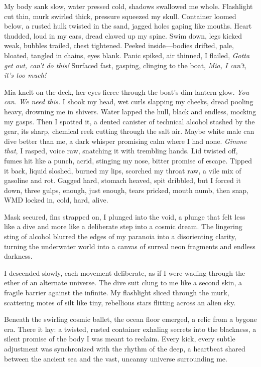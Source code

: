 \documentclass[12pt,oneside]{book}
\begin{document}
My body sank slow, water pressed cold, shadows swallowed me whole. Flashlight cut thin, murk swirled thick, pressure squeezed my skull. Container loomed below, a rusted hulk twisted in the sand, jagged holes gaping like mouths. Heart thudded, loud in my ears, dread clawed up my spine. Swim down, legs kicked weak, bubbles trailed, chest tightened. Peeked inside—bodies drifted, pale, bloated, tangled in chains, eyes blank. Panic spiked, air thinned, I flailed, \textit{Gotta get out, can’t do this!} Surfaced fast, gasping, clinging to the boat, \textit{Mia, I can’t, it’s too much!}

Mia knelt on the deck, her eyes fierce through the boat’s dim lantern glow. \textit{You can. We need this.} I shook my head, wet curls slapping my cheeks, dread pooling heavy, drowning me in shivers. Water lapped the hull, black and endless, mocking my gasps. Then I spotted it, a dented canister of technical alcohol stashed by the gear, its sharp, chemical reek cutting through the salt air. Maybe white male can dive better than me, a dark whisper promising calm where I had none. \textit{Gimme that}, I rasped, voice raw, snatching it with trembling hands. Lid twisted off, fumes hit like a punch, acrid, stinging my nose, bitter promise of escape. Tipped it back, liquid sloshed, burned my lips, scorched my throat raw, a vile mix of gasoline and rot. Gagged hard, stomach heaved, spit dribbled, but I forced it down, three gulps, enough, just enough, tears pricked, mouth numb, then snap, WMD locked in, cold, hard, alive.

Mask secured, fins strapped on, I plunged into the void, a plunge that felt less like a dive and more like a deliberate step into a cosmic dream. The lingering sting of alcohol blurred the edges of my paranoia into a disorienting clarity, turning the underwater world into a canvas of surreal neon fragments and endless darkness.

I descended slowly, each movement deliberate, as if I were wading through the ether of an alternate universe. The dive suit clung to me like a second skin, a fragile barrier against the infinite. My flashlight sliced through the murk, scattering motes of silt like tiny, rebellious stars flitting across an alien sky.

Beneath the swirling cosmic ballet, the ocean floor emerged, a relic from a bygone era. There it lay: a twisted, rusted container exhaling secrets into the blackness, a silent promise of the body I was meant to reclaim. Every kick, every subtle adjustment was synchronized with the rhythm of the deep, a heartbeat shared between the ancient sea and the vast, uncanny universe surrounding me.
\end{document}
